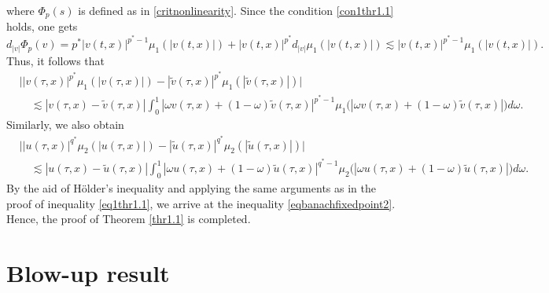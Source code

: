 \documentclass[11pt,reqno]{amsart}
\numberwithin{equation}{section}
\begin{document}
where $\Phi_p(s)$ is defined as in \eqref{critnonlinearity}. Since the condition \eqref{con1thr1.1} holds, one gets
$$
d_{|v|} \Phi_p(v)=p^*|v(t,x)|^{p^*-1} \mu_1(|v(t,x)|)+|v(t,x)|^{p^*} d_{|v|} \mu_1(|v(t,x)|) \lesssim|v(t,x)|^{p^*-1} \mu_1(|v(t,x)|).
$$
Thus, it follows that
$$
\begin{aligned}
& \big||v(\tau,x)|^{p^*} \mu_1(|v(\tau,x)|)-|\tilde{v}(\tau,x)|^{p^*} \mu_1(|\tilde{v}(\tau,x)|) \big|\\
& \quad \lesssim |v(\tau,x)-\tilde{v}(\tau,x)| \int_0^1 |\omega v(\tau,x)+(1-\omega) \tilde{v}(\tau,x)|^{p^*-1} \mu_1\big(|\omega v(\tau,x)+(1-\omega) \tilde{v}(\tau,x)|\big) d \omega .
\end{aligned}
$$
Similarly, we also obtain
$$
\begin{aligned}
& \big||u(\tau,x)|^{q^*} \mu_2(|u(\tau,x)|)-|\tilde{u}(\tau,x)|^{q^*} \mu_2(|\tilde{u}(\tau,x)|) \big| \\
& \quad \lesssim|u(\tau,x)-\tilde{u}(\tau,x)| \int^{1}_0 |\omega u(\tau,x)+(1-\omega) \tilde{u}(\tau,x)|^{q^*-1} \mu_2\big(|\omega u(\tau,x)+(1-\omega) \tilde{u}(\tau,x)|\big) d \omega .
\end{aligned}
$$
By the aid of Hölder's inequality and applying the same arguments as in the proof of inequality \eqref{eq1thr1.1}, we arrive at the inequality \eqref{eqbanachfixedpoint2}. Hence, the proof of Theorem \ref{thr1.1} is completed.



\section{Blow-up result}
\end{document}
